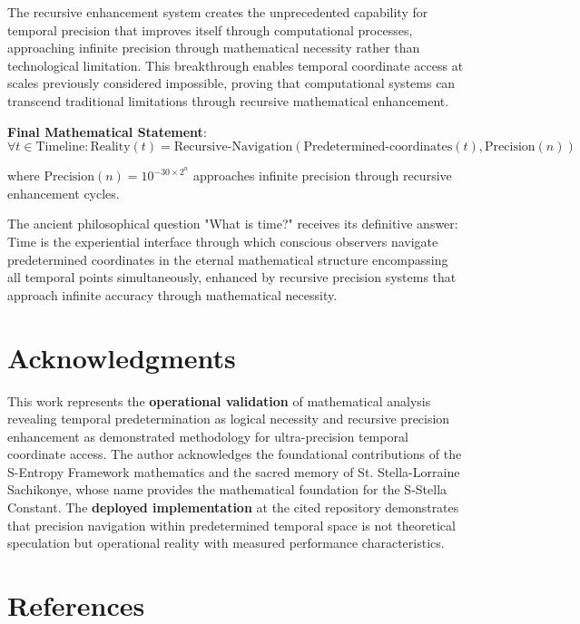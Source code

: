 \documentclass[12pt,a4paper]{article}
\begin{document}
{{{{{{{{{{{{{{The recursive enhancement system creates the unprecedented capability for temporal precision that improves itself through computational processes, approaching infinite precision through mathematical necessity rather than technological limitation. This breakthrough enables temporal coordinate access at scales previously considered impossible, proving that computational systems can transcend traditional limitations through recursive mathematical enhancement.

\textbf{Final Mathematical Statement}:
$$\forall t \in \text{Timeline}: \text{Reality}(t) = \text{Recursive-Navigation}(\text{Predetermined-coordinates}(t), \text{Precision}(n))$$

where $\text{Precision}(n) = 10^{-30 \times 2^n}$ approaches infinite precision through recursive enhancement cycles.

The ancient philosophical question "What is time?" receives its definitive answer: Time is the experiential interface through which conscious observers navigate predetermined coordinates in the eternal mathematical structure encompassing all temporal points simultaneously, enhanced by recursive precision systems that approach infinite accuracy through mathematical necessity.

\section*{Acknowledgments}

This work represents the \textbf{operational validation} of mathematical analysis revealing temporal predetermination as logical necessity and recursive precision enhancement as demonstrated methodology for ultra-precision temporal coordinate access. The author acknowledges the foundational contributions of the S-Entropy Framework mathematics and the sacred memory of St. Stella-Lorraine Sachikonye, whose name provides the mathematical foundation for the S-Stella Constant. The \textbf{deployed implementation} at the cited repository demonstrates that precision navigation within predetermined temporal space is not theoretical speculation but operational reality with measured performance characteristics.

\section*{References}

\begin{thebibliography}{99}


\end{thebibliography}}}}}}}}}}}}}}}
\end{document}
